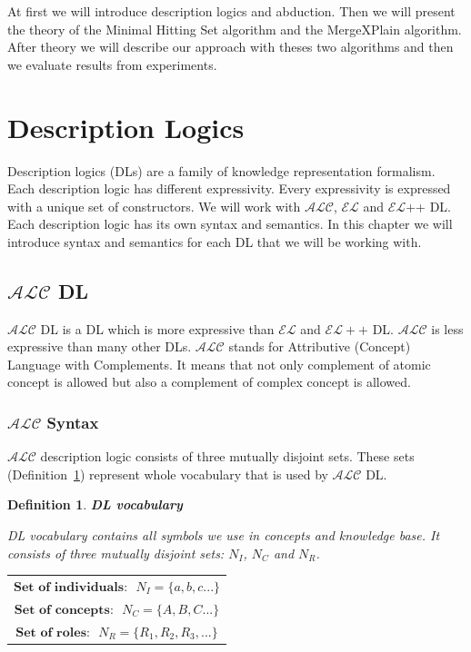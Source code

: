 \documentclass[12pt,a4paper]{article}
\newtheorem{definition}{Definition}[subsection]
\begin{document}
At first we will introduce description logics and abduction. Then we will present the theory of the Minimal Hitting Set algorithm and the MergeXPlain algorithm. After theory we will describe our approach with theses two algorithms and then we evaluate results from experiments.

\pagebreak
\section{Description Logics}
Description logics (DLs) are a family of knowledge representation formalism. Each description logic has different expressivity. Every expressivity is expressed with a unique set of constructors. We will work with $\mathcal{ALC}$, $\mathcal{EL}$ and $\mathcal{EL}${+}{+} DL. Each description logic has its own syntax and semantics. In this chapter we will introduce syntax and semantics \citep{Rudolph2011} for each DL that we will be working with.

\subsection{$\mathcal{ALC}$ DL}
$\mathcal{ALC}$ DL is a DL which is more expressive than $\mathcal{EL}$ and $\mathcal{EL}{+}{+}$ DL. $\mathcal{ALC}$ is less expressive than many other DLs. $\mathcal{ALC}$ stands for Attributive (Concept) Language with Complements. It means that not only complement of atomic concept is allowed but also a complement of complex concept is allowed.

\subsubsection{$\mathcal{ALC}$ Syntax}
$\mathcal{ALC}$ description logic consists of three mutually disjoint sets. These sets (Definition~\ref{def:DLVocabulary}) represent whole vocabulary that is used by $\mathcal{ALC}$ DL.

\begin{definition}{\textbf{DL vocabulary}}
	\label{def:DLVocabulary}
	
	DL vocabulary contains all symbols we use in concepts and knowledge base. It consists of three mutually disjoint sets: $N_{I}$, $N_{C}$ and $N_{R}$. 
	
	\begin{table}[H]
		\centering
		\begin{tabular}{c}
			$ \textbf{Set of individuals:} \text{ } N_{I} = \{a,b,c...\} $ \\
			\addlinespace[0.4cm]
			$ \textbf{Set of concepts:} \text{ } N_{C} = \{A,B,C...\} $ \\
			\addlinespace[0.4cm]
			$ \textbf{Set of roles:} \text{ } N_{R} = \{R_{1},R_{2},R_{3},...\} $			
		\end{tabular}
	\end{table}		
		
\end{definition}
\end{document}
